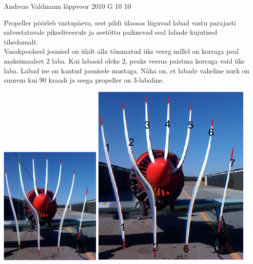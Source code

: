 \documentclass[11pt]{article}
\begin{document}
{%
{Andreas Valdmann} %
{lõppvoor} %
{2010} %
{G 10} %
{10} %
{

\ifSolution
\osa Propeller pöörleb vastupäeva, sest pildi ülaosas liiguvad labad vastu parajasti salvestatavale pikseliveerule ja seetõttu paiknevad seal labade kujutised tihedamalt.\\
\osa Vasakpoolsesl joonisel on ülalt alla tõmmatud üks veerg millel on korraga peal maksimaalset 2 laba. Kui labasid oleks 2, peaks veerus paistma korraga vaid üks laba. Labad ise on kantud joonisele mustaga. Näha on, et labade vaheline nurk on suurem kui 90 kraadi ja seega propeller on 3-labaline.

\begin{center}
	\includegraphics[width=50mm]{2010-v3g-10-Propeller2.jpg}
	\qquad
	\includegraphics{2010-v3g-10-proplah}
\end{center}

}}
\end{document}
